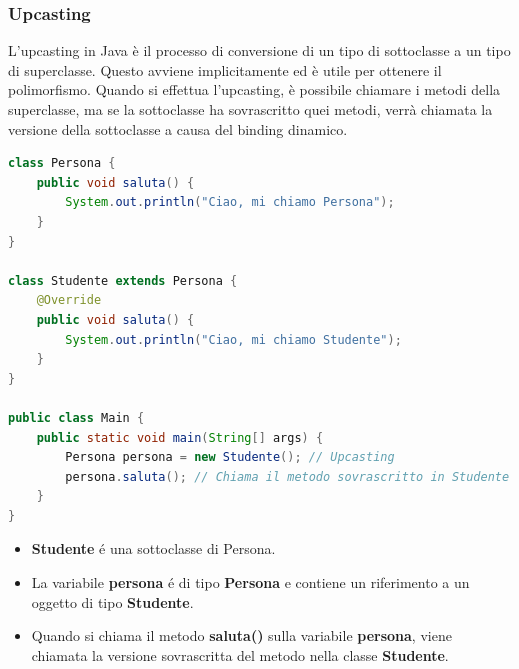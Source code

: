 \documentclass[11pt]{article}
\begin{document}
\subsubsection{Upcasting}
L'upcasting in Java è il processo di conversione di un tipo di sottoclasse a un tipo di superclasse.
Questo avviene implicitamente ed è utile per ottenere il polimorfismo. Quando si effettua l'upcasting, è possibile chiamare i metodi della superclasse,
ma se la sottoclasse ha sovrascritto quei metodi, verrà chiamata la versione della sottoclasse a causa del binding dinamico.
\begin{lstlisting}[language=Java]
    class Persona {
    public void saluta() {
        System.out.println("Ciao, mi chiamo Persona");
    }
}

class Studente extends Persona {
    @Override
    public void saluta() {
        System.out.println("Ciao, mi chiamo Studente");
    }
}

public class Main {
    public static void main(String[] args) {
        Persona persona = new Studente(); // Upcasting
        persona.saluta(); // Chiama il metodo sovrascritto in Studente
    }
}
\end{lstlisting}
\begin{itemize}
    \item \textbf{Studente} é una sottoclasse di Persona.
    \item La variabile \textbf{persona} é di tipo \textbf{Persona} e contiene un riferimento a un oggetto di tipo \textbf{Studente}.
    \item Quando si chiama il metodo \textbf{saluta()} sulla variabile \textbf{persona}, viene chiamata la versione sovrascritta del metodo nella classe \textbf{Studente}.
\end{itemize}
\end{document}
